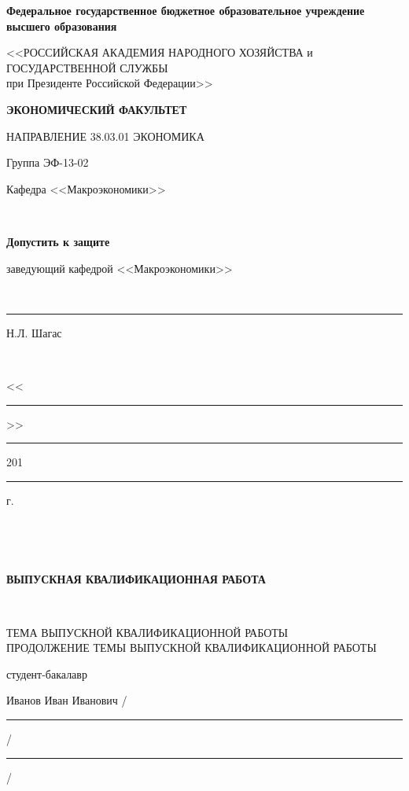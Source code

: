 \documentclass[12pt,a4paper, oneside]{extreport}
\begin{document}
\thispagestyle{empty} %


\begingroup
{}  
\begin{center}
\small \bfseries Федеральное государственное бюджетное образовательное учреждение высшего образования

<<РОССИЙСКАЯ АКАДЕМИЯ НАРОДНОГО ХОЗЯЙСТВА и\\ ГОСУДАРСТВЕННОЙ СЛУЖБЫ \\
при Президенте Российской Федерации>>

\vspace{2ex}

\bfseries
ЭКОНОМИЧЕСКИЙ ФАКУЛЬТЕТ

НАПРАВЛЕНИЕ 38.03.01 ЭКОНОМИКА
\end{center}

\vfill


\noindent Группа ЭФ-13-02
\hfill
\parbox[t]{20em}{\centering
Кафедра <<Макроэкономики>>

\mbox{ }

\textbf{Допустить к защите}

заведующий кафедрой <<Макроэкономики>>

\mbox{ }

\rule{8em}{0.5pt} Н.Л. Шагас

\mbox{ }

<<\rule{2em}{0.5pt}>> \rule{5em}{0.5pt} 201\rule{1em}{0.5pt} г. }

\mbox{ }

\mbox{ }

\begin{center}\bfseries
ВЫПУСКНАЯ КВАЛИФИКАЦИОННАЯ РАБОТА

\mbox{ }

\large
ТЕМА ВЫПУСКНОЙ КВАЛИФИКАЦИОННОЙ РАБОТЫ \\
ПРОДОЛЖЕНИЕ ТЕМЫ ВЫПУСКНОЙ КВАЛИФИКАЦИОННОЙ РАБОТЫ
\end{center}

\vfill

\noindent\normalsize
студент-бакалавр

\noindent
Иванов Иван Иванович
\hfill /\rule{6em}{0.5pt}/\rule{6em}{0.5pt}/

\hfill{}
\end{document}
